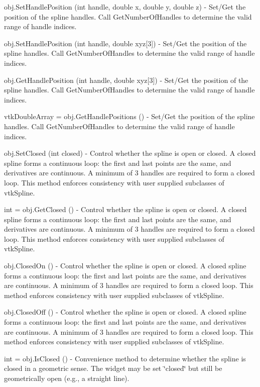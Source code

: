 \begin{DoxyItemize}
\item {\ttfamily obj.\-Set\-Handle\-Position (int handle, double x, double y, double z)} -\/ Set/\-Get the position of the spline handles. Call Get\-Number\-Of\-Handles to determine the valid range of handle indices.  
\item {\ttfamily obj.\-Set\-Handle\-Position (int handle, double xyz\mbox{[}3\mbox{]})} -\/ Set/\-Get the position of the spline handles. Call Get\-Number\-Of\-Handles to determine the valid range of handle indices.  
\item {\ttfamily obj.\-Get\-Handle\-Position (int handle, double xyz\mbox{[}3\mbox{]})} -\/ Set/\-Get the position of the spline handles. Call Get\-Number\-Of\-Handles to determine the valid range of handle indices.  
\item {\ttfamily vtk\-Double\-Array = obj.\-Get\-Handle\-Positions ()} -\/ Set/\-Get the position of the spline handles. Call Get\-Number\-Of\-Handles to determine the valid range of handle indices.  
\item {\ttfamily obj.\-Set\-Closed (int closed)} -\/ Control whether the spline is open or closed. A closed spline forms a continuous loop\-: the first and last points are the same, and derivatives are continuous. A minimum of 3 handles are required to form a closed loop. This method enforces consistency with user supplied subclasses of vtk\-Spline.  
\item {\ttfamily int = obj.\-Get\-Closed ()} -\/ Control whether the spline is open or closed. A closed spline forms a continuous loop\-: the first and last points are the same, and derivatives are continuous. A minimum of 3 handles are required to form a closed loop. This method enforces consistency with user supplied subclasses of vtk\-Spline.  
\item {\ttfamily obj.\-Closed\-On ()} -\/ Control whether the spline is open or closed. A closed spline forms a continuous loop\-: the first and last points are the same, and derivatives are continuous. A minimum of 3 handles are required to form a closed loop. This method enforces consistency with user supplied subclasses of vtk\-Spline.  
\item {\ttfamily obj.\-Closed\-Off ()} -\/ Control whether the spline is open or closed. A closed spline forms a continuous loop\-: the first and last points are the same, and derivatives are continuous. A minimum of 3 handles are required to form a closed loop. This method enforces consistency with user supplied subclasses of vtk\-Spline.  
\item {\ttfamily int = obj.\-Is\-Closed ()} -\/ Convenience method to determine whether the spline is closed in a geometric sense. The widget may be set \char`\"{}closed\char`\"{} but still be geometrically open (e.\-g., a straight line).  

\end{DoxyItemize}
